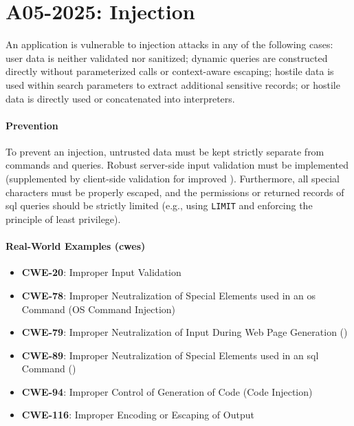 \section{A05-2025: Injection}
An application is vulnerable to injection attacks in any of the following cases: user data is neither validated nor sanitized; dynamic queries are constructed directly without parameterized calls or context-aware escaping; hostile data is used within  search parameters to extract additional sensitive records; or hostile data is directly used or concatenated into interpreters.

\paragraph{Prevention} To prevent an injection, untrusted data must be kept strictly separate from commands and queries. Robust server-side input validation must be implemented (supplemented by client-side validation for improved ). Furthermore, all special characters must be properly escaped, and the permissions or returned records of \gls{sql} queries should be strictly limited (e.g., using \texttt{LIMIT} and enforcing the principle of least privilege).

\paragraph{Real-World Examples (\glspl{cwe})}
\begin{itemize}
    \item \textbf{CWE-20}: Improper Input Validation
    \item \textbf{CWE-78}: Improper Neutralization of Special Elements used in an \gls{os} Command (OS Command Injection)
    \item \textbf{CWE-79}: Improper Neutralization of Input During Web Page Generation ()
    \item \textbf{CWE-89}: Improper Neutralization of Special Elements used in an \gls{sql} Command ()
    \item \textbf{CWE-94}: Improper Control of Generation of Code (Code Injection)
    \item \textbf{CWE-116}: Improper Encoding or Escaping of Output
\end{itemize}

